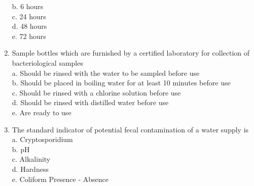 \begin{enumerate}[1.]
b. 6 hours\\
c. 24 hours\\
d. 48 hours\\
e. 72 hours\\
  \item Sample bottles which are furnished by a certified laboratory for collection of bacteriological samples\\
a. Should be rinsed with the water to be sampled before use\\
b. Should be placed in boiling water for at least 10 minutes before use\\
c. Should be rinsed with a chlorine solution before use\\
d. Should be rinsed with distilled water before use\\
e. Are ready to use\\

\item The standard indicator of potential fecal contamination of a water supply is\\
a. Cryptosporidium\\
b. $\mathrm{pH}$\\
c. Alkalinity\\
d. Hardness\\
e. Coliform Presence - Absence\\


\end{enumerate}
